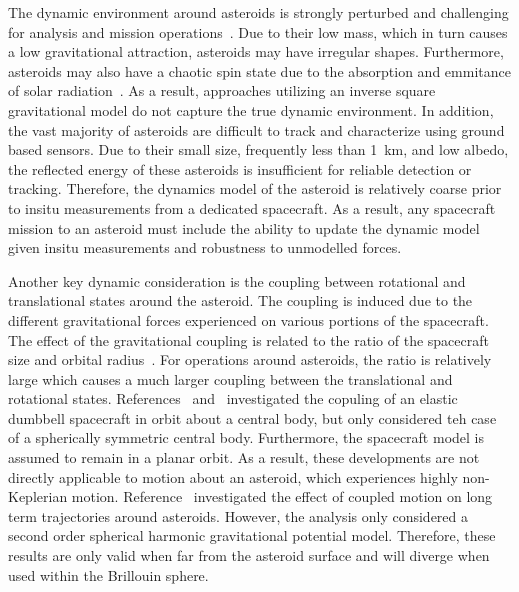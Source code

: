 \documentclass[letterpaper, paper,11pt]{AAS}		%
\begin{document}
The dynamic environment around asteroids is strongly perturbed and challenging for analysis and mission operations~\cite{scheeres2012}.
Due to their low mass, which in turn causes a low gravitational attraction, asteroids may have irregular shapes.
Furthermore, asteroids may also have a chaotic spin state due to the absorption and emmitance of solar radiation~\cite{rubincam2000}.
As a result, approaches utilizing an inverse square gravitational model do not capture the  true dynamic environment.
In addition, the vast majority of asteroids are difficult to track and characterize using ground based sensors.
Due to their small size, frequently less than \SI{1}{\kilo\meter}, and low albedo, the reflected energy of these asteroids is insufficient for reliable detection or tracking.
Therefore, the dynamics model of the asteroid is relatively coarse prior to insitu measurements from a dedicated spacecraft.
As a result, any spacecraft mission to an asteroid must include the ability to update the dynamic model given insitu measurements and robustness to unmodelled forces.

Another key dynamic consideration is the coupling between rotational and translational states around the asteroid.
The coupling is induced due to the different gravitational forces experienced on various portions of the spacecraft. 
The effect of the gravitational coupling is related to the ratio of the spacecraft size and orbital radius~\cite{hughes2004}.
For operations around asteroids, the ratio is relatively large which causes a much larger coupling between the translational and rotational states.
References~\cite{elmasri2005} and~\cite{sanyal2004a} investigated the copuling of an elastic dumbbell spacecraft in orbit about a central body, but only considered teh case of a spherically symmetric central body.
Furthermore, the spacecraft model is assumed to remain in a planar orbit.
As a result, these developments are not directly applicable to motion about an asteroid, which experiences highly non-Keplerian motion.
Reference~\cite{misra2015b} investigated the effect of coupled motion on long term trajectories around asteroids.
However, the analysis only considered a second order spherical harmonic gravitational potential model. 
Therefore, these results are only valid when far from the asteroid surface and will diverge when used within the Brillouin sphere.
\end{document}
